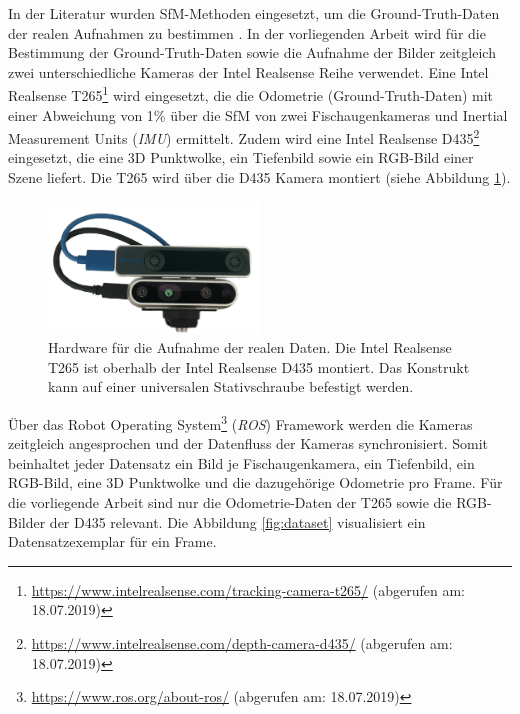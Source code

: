 In der Literatur wurden SfM-Methoden eingesetzt, um die Ground-Truth-Daten der realen Aufnahmen zu bestimmen \cite{kendallPoseNetConvolutionalNetwork2015, clarkVidLocDeepSpatioTemporal2017, acharyaBIMPoseNetIndoorCamera2019}. 
In der vorliegenden Arbeit wird für die Bestimmung der Ground-Truth-Daten sowie die Aufnahme der Bilder zeitgleich zwei unterschiedliche Kameras der Intel Realsense Reihe verwendet. Eine Intel Realsense T265\footnote{\url{https://www.intelrealsense.com/tracking-camera-t265/} (abgerufen am: 18.07.2019)} wird eingesetzt, die die Odometrie (Ground-Truth-Daten) mit einer Abweichung von 1\%  über die SfM von zwei Fischaugenkameras und Inertial Measurement Units (\textit{IMU}) ermittelt. Zudem wird eine Intel Realsense D435\footnote{ \url{https://www.intelrealsense.com/depth-camera-d435/} (abgerufen am: 18.07.2019)} eingesetzt, die eine 3D Punktwolke, ein Tiefenbild sowie ein RGB-Bild einer Szene liefert. Die T265 wird über die D435 Kamera montiert (siehe Abbildung \ref{fig:t265_d435}). 

\begin{figure}[H]
	\centering
	\includegraphics[width=0.5\textwidth]{images/real_dataset/t265_d435_2.png}
	\caption{Hardware für die Aufnahme der realen Daten. Die Intel Realsense T265 ist oberhalb der Intel Realsense D435 montiert. Das Konstrukt kann auf einer universalen Stativschraube befestigt werden.  }
	\label{fig:t265_d435}
\end{figure}

Über das Robot Operating System\footnote{\url{https://www.ros.org/about-ros/} (abgerufen am: 18.07.2019)} (\textit{ROS}) Framework werden die Kameras zeitgleich angesprochen und der Datenfluss der Kameras synchronisiert. Somit beinhaltet jeder Datensatz ein Bild je Fischaugenkamera, ein Tiefenbild, ein RGB-Bild, eine 3D Punktwolke und die dazugehörige Odometrie pro Frame. Für die vorliegende Arbeit sind nur die Odometrie-Daten der T265 sowie die RGB-Bilder der D435 relevant. Die Abbildung \ref{fig:dataset} visualisiert ein Datensatzexemplar für ein Frame.


